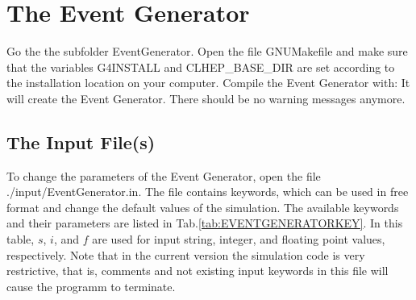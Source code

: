 \documentclass[12pt]{book}
\begin{document}
\chapter{The Event Generator}

Go the the subfolder {\ttfamily EventGenerator}.
Open the file {\ttfamily GNUMakefile} and make sure that the variables {\ttfamily G4INSTALL}
and {\ttfamily CLHEP\_BASE\_DIR} are set according to the installation location on your computer.
Compile the Event Generator with:\hfill{}
\linebreak
{}
\linebreak
\linebreak
It will create the Event Generator. There should be no warning messages anymore.

\section{The Input File(s)}

To change the parameters of the Event Generator, open the file 
{\ttfamily ./input/EventGenerator.in}. The file contains keywords, which can be used
in free format and change the default values of the simulation. The available keywords and their
parameters are listed in Tab.\ref{tab:EVENTGENERATORKEY}. In this table, $s$, $i$, and $f$ are used
for input string, integer, and floating point values, respectively. Note that in the current version
the simulation code is very restrictive, that is, comments and not existing input keywords in this file
will cause the programm to terminate.
\end{document}

